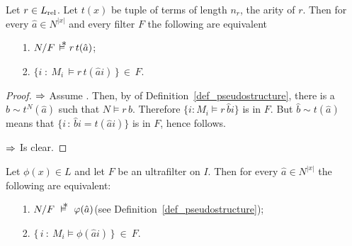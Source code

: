 \begin{proposition}\label{prop_eq_ultra}
  Let $r\in L_{\rm rel}$.
  Let $t(x)$ be tuple of terms of length $n_r$, the arity of $r$.
  Then for every $\hat a\in N^{|x|}$ and every filter $F$ the following are equivalent
  \begin{itemize}
  \item[1.] $N/F\,\pmodels r\,t(\hat a)$;

  \item[2.] $\big\{i\; :\ M_i\,\models r\,t(\hat ai)\,\big\}\,\in\, F$.
  \end{itemize}
\end{proposition}

\begin{proof}
  $\Rightarrow$ 
  Assume .
  Then, by  of Definition~\ref{def_pseudostructure}, there is a $\hat b\sim t^N(\hat a)$ such that $N\models r\,\hat b$.
  Therefore $\{i:M_i\models r\,\hat bi\}$ is in $F$.
  But $\hat b\sim t(\hat a)$ means that $\big\{i\, :\, \hat bi= t(\hat ai)\big\}$ is in $F$, hence  follows.

  $\Rightarrow$ Is clear.
\end{proof}

\begin{void}[\L o\'{s}'s Theorem]\label{thm_los}
Let $\phi(x)\in L$ and let $F$ be an ultrafilter on $I$. Then for every $\hat a\in N^{|x|}$ the following are equivalent:
\begin{itemize}
\item[1.] $N/F\ \pmodels\ \phi(\hat a)$\hfill (see  Definition~\ref{def_pseudostructure});
\item[2.] $\big\{\,i\ :\ M_i\models \phi(\hat a i)\,\big\}\ \in\ F$.
\end{itemize}
\end{void}

